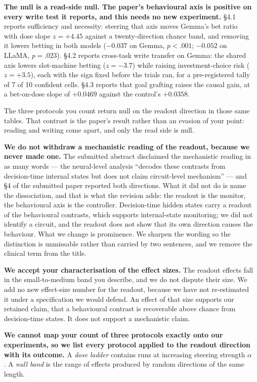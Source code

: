 \textbf{The null is a read-side null. The paper's behavioural axis is positive on every write test
it reports, and this needs no new experiment.} \S4.1 reports sufficiency and necessity: steering
that axis moves Gemma's bet ratio with dose slope $z = +4.45$ against a twenty-direction chance
band, and removing it lowers betting in both models ($-0.037$ on Gemma, $p < .001$; $-0.052$ on
LLaMA, $p = .023$). \S4.2 reports cross-task write transfer on Gemma: the shared axis lowers
slot-machine betting ($z = -3.7$) while raising investment-choice risk ($z = +3.5$), each with the
sign fixed before the trials ran, for a pre-registered tally of 7 of 10 confident cells. \S4.3
reports that goal grafting raises the causal gain, at a bet-on-dose slope of $+0.0469$ against the
control's $+0.0358$.

The three protocols you count return null on the readout direction in those same tables. That
contrast is the paper's result rather than an evasion of your point: reading and writing come apart,
and only the read side is null.

\textbf{We do not withdraw a mechanistic reading of the readout, because we never made one.} The
submitted abstract disclaimed the mechanistic reading in as many words --- the neural-level
analysis ``decodes these contrasts from decision-time internal states but does not claim
circuit-level mechanism'' --- and \S4 of the submitted paper reported both directions. What it did
not do is name the dissociation, and that is what the revision adds: the readout is the monitor,
the behavioural axis is the controller. Decision-time hidden states carry a readout of the behavioural contrasts,
which supports internal-state monitoring; we did not identify a circuit, and the readout does not
show that its own direction causes the behaviour. What we change is prominence. We sharpen the
wording so the distinction is unmissable rather than carried by two sentences, and we remove the
clinical term from the title.

\textbf{We accept your characterisation of the effect sizes.} The readout effects fall in the
small-to-medium band you describe, and we do not dispute their size. We add no new effect-size
number for the readout, because we have not re-estimated it under a specification we would defend.
An effect of that size supports our retained claim, that a behavioural contrast is recoverable
above chance from decision-time states. It does not support a mechanistic claim.

\textbf{We cannot map your count of three protocols exactly onto our experiments, so we list every
protocol applied to the readout direction with its outcome.} A \emph{dose ladder} contains runs at
increasing steering strength $\alpha$. A \emph{null band} is the range of effects produced by random
directions of the same length.

